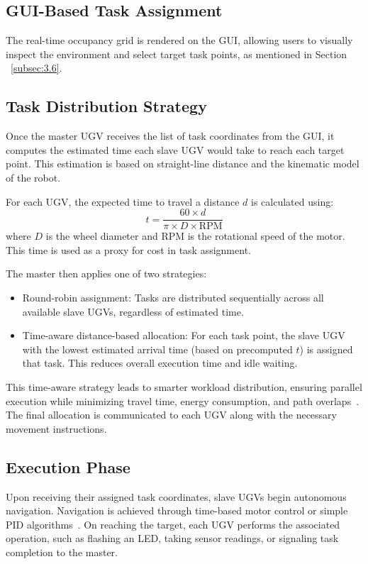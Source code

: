\documentclass[conference]{IEEEtran}
\begin{document}
\subsection{GUI-Based Task Assignment}
The real-time occupancy grid is rendered on the GUI, allowing users to visually inspect the environment and select target task points, as mentioned in Section ~\ref{subsec:3.6}. 

\subsection{Task Distribution Strategy}
\label{subsec:task_dist}
Once the master UGV receives the list of task coordinates from the GUI, it computes the estimated time each slave UGV would take to reach each target point. This estimation is based on straight-line distance and the kinematic model of the robot.

For each UGV, the expected time to travel a distance $d$ is calculated using:
\begin{equation}
t = \frac{60 \times d}{\pi \times D \times \text{RPM}}
\end{equation}
where $D$ is the wheel diameter and RPM is the rotational speed of the motor. This time is used as a proxy for cost in task assignment.

The master then applies one of two strategies:
\begin{itemize}
    \item {Round-robin assignment:} Tasks are distributed sequentially across all available slave UGVs, regardless of estimated time.
    
    \item {Time-aware distance-based allocation:} For each task point, the slave UGV with the lowest estimated arrival time (based on precomputed $t$) is assigned that task. This reduces overall execution time and idle waiting.
\end{itemize}

This time-aware strategy leads to smarter workload distribution, ensuring parallel execution while minimizing travel time, energy consumption, and path overlaps~\cite{jin2024multi}. The final allocation is communicated to each UGV along with the necessary movement instructions.


\subsection{Execution Phase}
Upon receiving their assigned task coordinates, slave UGVs begin autonomous navigation. Navigation is achieved through time-based motor control or simple PID algorithms~\cite{gadepalli2023future}. On reaching the target, each UGV performs the associated operation, such as flashing an LED, taking sensor readings, or signaling task completion to the master.
\end{document}
